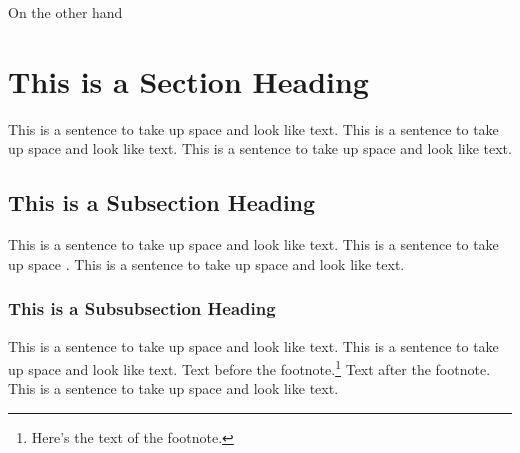 On the other hand\cite{jarvis2010importance}

 
\section{This is a Section Heading}
 
This is a sentence to take up space and look like text.
This is a sentence to take up space and look like text.
This is a sentence to take up space and look like text.
 
\subsection{This is a Subsection Heading} 
 
This is a sentence to take up space and look like text.
This is a sentence to take up space \cite{anotherbook}.
This is a sentence to take up space and look like text.
 
\subsubsection{This is a Subsubsection Heading}
This is a sentence to take up space and look like text.
This is a sentence to take up space and look like text.
Text before the footnote.\footnote{Here's the text of the footnote.}
Text after the footnote. 
This is a sentence to take up space and look like text.

